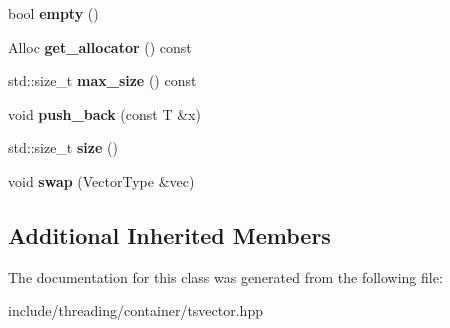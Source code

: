 \begin{DoxyCompactItemize}
\item 
\hypertarget{classcore_1_1threading_1_1container_1_1_t_s_vector_a14e7f1a0bbc373b0fa114ed985b6ded6}{bool {\bfseries empty} ()}\label{classcore_1_1threading_1_1container_1_1_t_s_vector_a14e7f1a0bbc373b0fa114ed985b6ded6}

\item 
\hypertarget{classcore_1_1threading_1_1container_1_1_t_s_vector_a82c2a5b44ae790808de3a3d1458cb5fc}{Alloc {\bfseries get\-\_\-allocator} () const }\label{classcore_1_1threading_1_1container_1_1_t_s_vector_a82c2a5b44ae790808de3a3d1458cb5fc}

\item 
\hypertarget{classcore_1_1threading_1_1container_1_1_t_s_vector_adbedcb58813d79fb8dc087bacd788db5}{std\-::size\-\_\-t {\bfseries max\-\_\-size} () const }\label{classcore_1_1threading_1_1container_1_1_t_s_vector_adbedcb58813d79fb8dc087bacd788db5}

\item 
\hypertarget{classcore_1_1threading_1_1container_1_1_t_s_vector_a6cb63ec0be6cada6f6a95cc91aa734df}{void {\bfseries push\-\_\-back} (const T \&x)}\label{classcore_1_1threading_1_1container_1_1_t_s_vector_a6cb63ec0be6cada6f6a95cc91aa734df}

\item 
\hypertarget{classcore_1_1threading_1_1container_1_1_t_s_vector_aea86a297461e5340e04b77d635652a35}{std\-::size\-\_\-t {\bfseries size} ()}\label{classcore_1_1threading_1_1container_1_1_t_s_vector_aea86a297461e5340e04b77d635652a35}

\item 
\hypertarget{classcore_1_1threading_1_1container_1_1_t_s_vector_a0f3e2e3d6bdd66ad1085d2cf6a417a03}{void {\bfseries swap} (Vector\-Type \&vec)}\label{classcore_1_1threading_1_1container_1_1_t_s_vector_a0f3e2e3d6bdd66ad1085d2cf6a417a03}

\end{DoxyCompactItemize}
\subsection*{Additional Inherited Members}


The documentation for this class was generated from the following file\-:\begin{DoxyCompactItemize}
\item 
include/threading/container/tsvector.\-hpp\end{DoxyCompactItemize}
